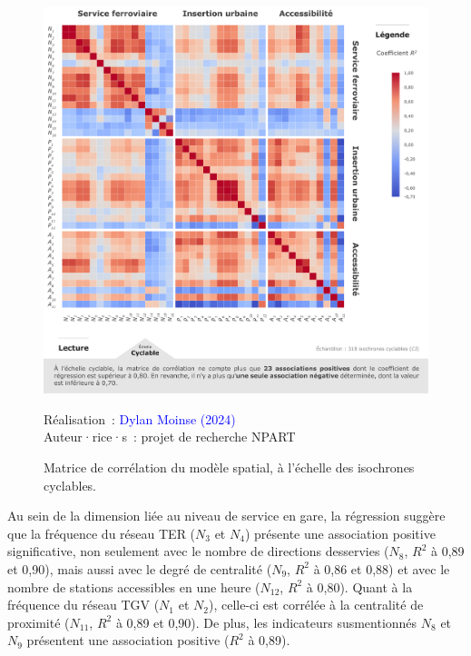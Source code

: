 \begin{refsegment}
    \begin{figure}[h!]\vspace*{4pt}
        \caption{Matrice de corrélation du modèle spatial, à l'échelle des isochrones cyclables.}
        \label{fig-chap6:correlations-indicateurs-independants-CI}
        \centerline{\includegraphics[width=1\columnwidth]{src/Figures/Chap-6/FR_NPART_Matrice_Correlation_CI.pdf}}
        \vspace{5pt}
        \begin{flushright}\scriptsize{
        Réalisation~: \textcolor{blue}{Dylan Moinse (2024)}
        \\
        Auteur·rice·s~: projet de recherche \acrshort{NPART}
        }\end{flushright}
    \end{figure}

Au sein de la dimension liée au niveau de service en gare, la régression suggère que la fréquence du réseau \acrshort{TER} (\(N_{3}\) et \(N_{4}\)) présente une association positive significative, non seulement avec le nombre de directions desservies (\(N_{8}\), \(R^{2}\) à 0,89 et 0,90), mais aussi avec le degré de centralité (\(N_{9}\), \(R^{2}\) à 0,86 et 0,88) et avec le nombre de stations accessibles en une heure (\(N_{12}\), \(R^{2}\) à 0,80). Quant à la fréquence du réseau \acrshort{TGV} (\(N_{1}\) et \(N_{2}\)), celle-ci est corrélée à la centralité de proximité (\(N_{11}\), \(R^{2}\) à 0,89 et 0,90). De plus, les indicateurs susmentionnés \(N_{8}\) et \(N_{9}\) présentent une association positive (\(R^{2}\) à 0,89).%


\end{refsegment}
